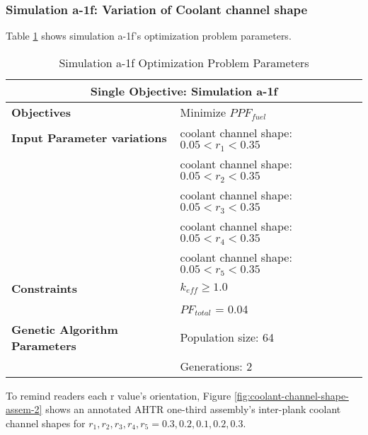 \subsubsection{Simulation a-1f: Variation of Coolant channel shape}
Table \ref{tab:simulationa1f} shows simulation a-1f's optimization problem parameters. 
\begin{table}[htbp!]
    \centering
    \onehalfspacing
    \caption{Simulation a-1f Optimization Problem Parameters}
	\label{tab:simulationa1f}
    \footnotesize
    \begin{tabular}{l|p{6cm}}
    \hline 
    \multicolumn{2}{c}{\textbf{Single Objective: Simulation a-1f}} \\
    \hline 
    \textbf{Objectives} & Minimize $PPF_{fuel}$ \\
    \hline 
    \textbf{Input Parameter variations} 
    & coolant channel shape: $0.05<r_{1}<0.35$ \\
    & coolant channel shape: $0.05<r_{2}<0.35$ \\
    & coolant channel shape: $0.05<r_{3}<0.35$ \\
    & coolant channel shape: $0.05<r_{4}<0.35$ \\
    & coolant channel shape: $0.05<r_{5}<0.35$ \\
    \hline
    \textbf{Constraints} & $k_{eff} \geq 1.0$\\ 
    & $PF_{total}$ = 0.04 \\
    \hline 
    \textbf{Genetic Algorithm Parameters} & Population size: 64 \\
    & Generations: 2 \\
    \hline
    \end{tabular}
\end{table}
To remind readers each r value's orientation, Figure 
\ref{fig:coolant-channel-shape-assem-2} shows an annotated \gls{AHTR} one-third 
assembly's inter-plank coolant channel shapes for 
$r_1, r_2, r_3, r_4, r_5 = 0.3, 0.2, 0.1, 0.2, 0.3$.

